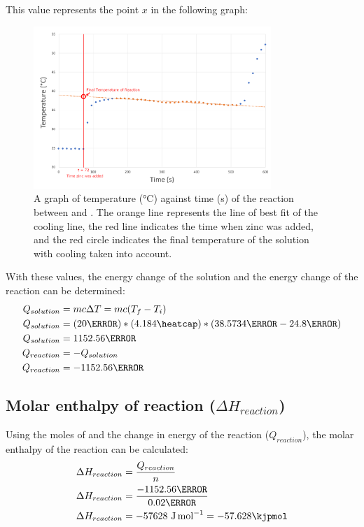 \documentclass[12pt, notitlepage, letterpaper]{report}
\begin{document}
This value represents the point $x$ in the following graph:

\begin{figure}[h!]
	\caption{A graph of temperature (\unit{\celsius}) against time (\unit{\second}) of the reaction between  and . The orange line represents the line of best fit of the cooling line, the red line indicates the time when zinc was added, and the red circle indicates the final temperature of the solution with cooling taken into account.}
	\centerline{\noindent\includegraphics[width=0.8\textwidth]{time-vs-temperature-marked.png}}
\end{figure}

With these values, the energy change of the solution and the energy change of the reaction can be determined:
\begin{align*}
	Q_{solution} & = mc\Delta T = mc(T_f - T_i)
	\\
	Q_{solution} & = (20\gram) * (4.184\heatcap) * (38.5734\celsius - 24.8\celsius)
	\\
	Q_{solution} & = 1152.56\joule
	\\
	Q_{reaction} & = -Q_{solution}
	\\
	Q_{reaction} & = -1152.56\joule
\end{align*}

\subsection*{Molar enthalpy of reaction ($\Delta H_{reaction}$)}

Using the moles of  and the change in energy of the reaction ($Q_{reaction}$), the molar enthalpy of the reaction can be calculated:
%
\begin{align*}
	\Delta H_{reaction} & = \frac{Q_{reaction}}{n}                        \\
	\Delta H_{reaction} & = \frac{-1152.56\joule}{0.02\mol}               \\
	\Delta H_{reaction} & = -57628~\unit{\joule\per\mol} = -57.628\kjpmol
\end{align*}
\end{document}

